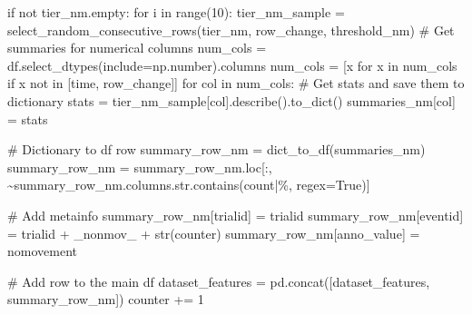 \documentclass[
  letterpaper,
  DIV=11,
  numbers=noendperiod]{scrreprt}
\newenvironment{Shaded}{\begin{snugshade}}{\end{snugshade}}
\newcommand{\BuiltInTok}[1]{\textcolor[rgb]{0.00,0.23,0.31}{#1}}
\newcommand{\CommentTok}[1]{\textcolor[rgb]{0.37,0.37,0.37}{#1}}
\newcommand{\ControlFlowTok}[1]{\textcolor[rgb]{0.00,0.23,0.31}{#1}}
\newcommand{\DecValTok}[1]{\textcolor[rgb]{0.68,0.00,0.00}{#1}}
\newcommand{\KeywordTok}[1]{\textcolor[rgb]{0.00,0.23,0.31}{#1}}
\newcommand{\NormalTok}[1]{\textcolor[rgb]{0.00,0.23,0.31}{#1}}
\newcommand{\OperatorTok}[1]{\textcolor[rgb]{0.37,0.37,0.37}{#1}}
\newcommand{\StringTok}[1]{\textcolor[rgb]{0.13,0.47,0.30}{#1}}
\newcommand{\VariableTok}[1]{\textcolor[rgb]{0.07,0.07,0.07}{#1}}
\begin{document}
\begin{Shaded}
\begin{Highlighting}[]
        \ControlFlowTok{if} \KeywordTok{not}\NormalTok{ tier\_nm.empty:}
            \ControlFlowTok{for}\NormalTok{ i }\KeywordTok{in} \BuiltInTok{range}\NormalTok{(}\DecValTok{10}\NormalTok{):}
\NormalTok{                tier\_nm\_sample }\OperatorTok{=}\NormalTok{ select\_random\_consecutive\_rows(tier\_nm, }\StringTok{\textquotesingle{}row\_change\textquotesingle{}}\NormalTok{, threshold\_nm)}
                \CommentTok{\# Get summaries for numerical columns}
\NormalTok{                num\_cols }\OperatorTok{=}\NormalTok{ df.select\_dtypes(include}\OperatorTok{=}\NormalTok{np.number).columns}
\NormalTok{                num\_cols }\OperatorTok{=}\NormalTok{ [x }\ControlFlowTok{for}\NormalTok{ x }\KeywordTok{in}\NormalTok{ num\_cols }\ControlFlowTok{if}\NormalTok{ x }\KeywordTok{not} \KeywordTok{in}\NormalTok{ [}\StringTok{\textquotesingle{}time\textquotesingle{}}\NormalTok{, }\StringTok{\textquotesingle{}row\_change\textquotesingle{}}\NormalTok{]]}
                \ControlFlowTok{for}\NormalTok{ col }\KeywordTok{in}\NormalTok{ num\_cols:}
                    \CommentTok{\# Get stats and save them to dictionary}
\NormalTok{                    stats }\OperatorTok{=}\NormalTok{ tier\_nm\_sample[col].describe().to\_dict()}
\NormalTok{                    summaries\_nm[col] }\OperatorTok{=}\NormalTok{ stats}

                \CommentTok{\# Dictionary to df row}
\NormalTok{                summary\_row\_nm }\OperatorTok{=}\NormalTok{ dict\_to\_df(summaries\_nm)}
\NormalTok{                summary\_row\_nm }\OperatorTok{=}\NormalTok{ summary\_row\_nm.loc[:, }\OperatorTok{\textasciitilde{}}\NormalTok{summary\_row\_nm.columns.}\BuiltInTok{str}\NormalTok{.contains(}\StringTok{\textquotesingle{}count|\%\textquotesingle{}}\NormalTok{, regex}\OperatorTok{=}\VariableTok{True}\NormalTok{)]}

                \CommentTok{\# Add metainfo}
\NormalTok{                summary\_row\_nm[}\StringTok{\textquotesingle{}trialid\textquotesingle{}}\NormalTok{] }\OperatorTok{=}\NormalTok{ trialid}
\NormalTok{                summary\_row\_nm[}\StringTok{\textquotesingle{}eventid\textquotesingle{}}\NormalTok{] }\OperatorTok{=}\NormalTok{ trialid }\OperatorTok{+} \StringTok{\textquotesingle{}\_nonmov\_\textquotesingle{}} \OperatorTok{+} \BuiltInTok{str}\NormalTok{(counter)}
\NormalTok{                summary\_row\_nm[}\StringTok{\textquotesingle{}anno\_value\textquotesingle{}}\NormalTok{] }\OperatorTok{=} \StringTok{\textquotesingle{}nomovement\textquotesingle{}}

                \CommentTok{\# Add row to the main df}
\NormalTok{                dataset\_features }\OperatorTok{=}\NormalTok{ pd.concat([dataset\_features, summary\_row\_nm])}
\NormalTok{                counter }\OperatorTok{+=} \DecValTok{1}


\end{Highlighting}
\end{Shaded}
\end{document}
